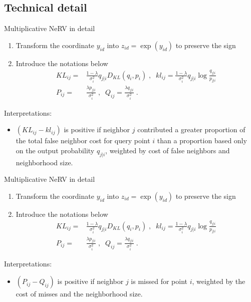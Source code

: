 \documentclass[first=dgreen,second=purple,logo=yellowexc]{aaltoslides}
\begin{document}
\subsection{Technical detail}
\begin{frame}{Multiplicative NeRV in detail}
\begin{enumerate}
\item Transform the coordinate $y_{id}$ into $z_{id}=\exp(y_{id})$ to preserve the sign
\item Introduce the notations below
\begin{align*}
KL_{ij}=&\frac{1-\lambda}{\sigma_i^2}q_{j|i}D_{KL}(q_i,p_i)\;,\;\;kl_{ij}=\frac{1-\lambda}{\sigma_i^2}q_{j|i}\log\frac{q_{j|i}}{p_{j|i}}\\
P_{ij}=&\frac{\lambda p_{j|i}}{\sigma_i^2}\;,\;\;Q_{ij}=\frac{\lambda q_{j|i}}{\sigma_i^2} \;.
\end{align*}
\end{enumerate}
Interpretations:
\begin{itemize}
\item \footnotesize{$(KL_{ij}-kl_{ij})$ is positive if neighbor $j$ contributed a greater proportion of the total false
neighbor cost for query point $i$ than a proportion based only on the output probability $q_{j|i}$,
weighted by cost of false neighbors and neighborhood size.}
\end{itemize}
\end{frame}


\begin{frame}{Multiplicative NeRV in detail}
\begin{enumerate}
\item Transform the coordinate $y_{id}$ into $z_{id}=\exp(y_{id})$ to preserve the sign
\item Introduce the notations below
\begin{align*}
KL_{ij}=&\frac{1-\lambda}{\sigma_i^2}q_{j|i}D_{KL}(q_i,p_i)\;,\;\;kl_{ij}=\frac{1-\lambda}{\sigma_i^2}q_{j|i}\log\frac{q_{j|i}}{p_{j|i}}\\
P_{ij}=&\frac{\lambda p_{j|i}}{\sigma_i^2}\;,\;\;Q_{ij}=\frac{\lambda q_{j|i}}{\sigma_i^2} \;.
\end{align*}
\end{enumerate}

Interpretations:
\begin{itemize}
\item \footnotesize{$(P_{ij}-Q_{ij})$ is positive if neighbor $j$ is missed for point $i$, weighted by the cost of misses and the neighborhood size.

}
\end{itemize}
\end{frame}
\end{document}
